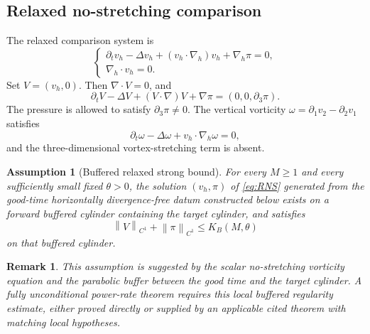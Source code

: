 \documentclass[pdflatex,sn-mathphys-num]{sn-jnl}
\numberwithin{equation}{section}
\theoremstyle{thmstyleone}
\newtheorem{assumption}[theorem]{Assumption}
\theoremstyle{thmstylethree}
\newtheorem{remark}[theorem]{Remark}
\newcommand{\nabh}{\nabla_h}
\newcommand{\norm}[2]{\left\|#1\right\|_{#2}}
\begin{document}
\subsection{Relaxed no-stretching comparison}

The relaxed comparison system is
\begin{equation}
\begin{cases}
\partial_t v_h-\Delta v_h+(v_h\cdot\nabh)v_h+\nabh\pi=0,\\
\nabh\cdot v_h=0.
\end{cases}
\label{eq:RNS}
\end{equation}
Set \(V=(v_h,0)\).  Then \(\nabla\cdot V=0\), and
\begin{equation}
        \partial_tV-\Delta V+(V\cdot\nabla)V+\nabla\pi
        =(0,0,\partial_3\pi).
        \label{eq:RNS-3D}
\end{equation}
The pressure is allowed to satisfy \(\partial_3\pi\ne0\).  The vertical vorticity \(\omega=\partial_1v_2-\partial_2v_1\) satisfies
\[
        \partial_t\omega-\Delta\omega+v_h\cdot\nabh\omega=0,
\]
and the three-dimensional vortex-stretching term is absent.

\begin{assumption}[Buffered relaxed strong bound]
\label{ass:relaxed-strong}
For every \(M\ge1\) and every sufficiently small fixed \(\theta>0\), the solution \((v_h,\pi)\) of \eqref{eq:RNS} generated from the good-time horizontally divergence-free datum constructed below exists on a forward buffered cylinder containing the target cylinder, and satisfies
\begin{equation}
        \norm{V}{C^1}+\norm{\pi}{C^1}
        \le K_B(M,\theta)
        \label{eq:buffered-bound}
\end{equation}
on that buffered cylinder.
\end{assumption}

\begin{remark}
This assumption is suggested by the scalar no-stretching vorticity equation and the parabolic buffer between the good time and the target cylinder.  A fully unconditional power-rate theorem requires this local buffered regularity estimate, either proved directly or supplied by an applicable cited theorem with matching local hypotheses.
\end{remark}
\end{document}
